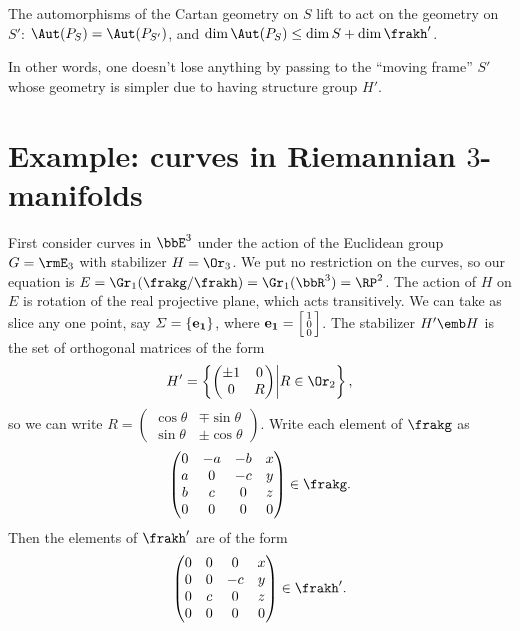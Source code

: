 \begin{cor}
    The automorphisms of the Cartan geometry on $S$ lift to act on the geometry on $S'$: $\Aut(P_S)=\Aut(P_{S'})$, and $\dim \Aut(P_S)\leq \dim S+\dim \frakh'$.
\end{cor}

In other words, one doesn't lose anything by passing to the ``moving frame'' $S'$ whose geometry is simpler due to having structure group $H'$.






\section{Example: curves in Riemannian $3$-manifolds}

First consider curves in $\bbE^3$ under the action of the Euclidean group $G=\rmE_3$ with stabilizer $H=\Or_3$. We put no restriction on the curves, so our equation is $E=\Gr_1(\frakg\slash\frakh)=\Gr_1(\bbR^3)=\RP^2$. The action of $H$ on $E$ is rotation of the real projective plane, which acts transitively. We can take as slice any one point, say $\varSigma=\{\bf{e}_1\}$, where $\bf{e}_1=\left[\begin{smallmatrix}
    1 \\ 0\\0
\end{smallmatrix}\right]$. The stabilizer $H'\emb H$ is the set of orthogonal matrices of the form 
\[H'=\left\{\begin{pmatrix}
\pm 1 & 0\\
0 & R
\end{pmatrix}\middle| R\in \Or_2\right\},\]
so we can write $R=\left(\begin{smallmatrix}
    \cos \theta & \mp\sin\theta\\ \sin\theta & \pm\cos\theta
\end{smallmatrix}\right)$. Write each element of $\frakg$ as 
\[\begin{pmatrix}
    0 & -a & -b & x \\
    a & 0 & -c & y\\
    b & c & 0 & z\\
    0 & 0 & 0 & 0
\end{pmatrix}\in\frakg.\]
Then the elements of $\frakh'$ are of the form 
\[\begin{pmatrix}
    0 & 0 & 0 & x \\
    0 & 0 & -c & y\\
    0 & c & 0 & z\\
    0 & 0 & 0 & 0
\end{pmatrix}\in\frakh'.\]
